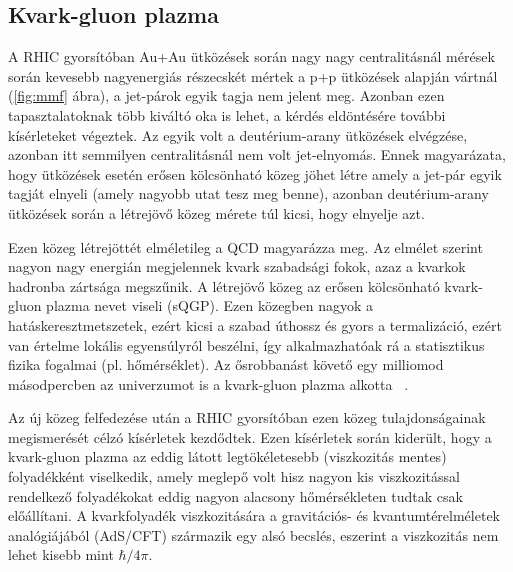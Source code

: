 \documentclass[11pt,a4paper]{article}
\numberwithin{equation}{subsection}
\numberwithin{figure}{section}
\begin{document}
\subsection{Kvark-gluon plazma}

A RHIC gyorsítóban Au+Au ütközések során nagy nagy centralitásnál mérések során kevesebb nagyenergiás részecskét mértek a p+p ütközések alapján vártnál (\ref{fig:mmf} ábra), a jet-párok egyik tagja nem jelent meg. Azonban ezen tapasztalatoknak több kiváltó oka is lehet, a kérdés eldöntésére további kísérleteket végeztek. Az egyik volt a deutérium-arany ütközések elvégzése, azonban itt semmilyen centralitásnál nem volt jet-elnyomás. Ennek magyarázata, hogy ütközések esetén erősen kölcsönható közeg jöhet létre amely a jet-pár egyik tagját elnyeli (amely nagyobb utat tesz meg benne), azonban deutérium-arany ütközések során a létrejövő közeg mérete túl kicsi, hogy elnyelje azt.

Ezen közeg létrejöttét elméletileg a QCD magyarázza meg. Az elmélet szerint nagyon nagy energián megjelennek kvark szabadsági fokok, azaz a kvarkok hadronba zártsága megszűnik. A létrejövő közeg az erősen kölcsönható kvark-gluon plazma nevet viseli (sQGP). Ezen közegben nagyok a hatáskeresztmetszetek, ezért kicsi a szabad úthossz és gyors a termalizáció, ezért van értelme lokális egyensúlyról beszélni, így alkalmazhatóak rá a statisztikus fizika fogalmai (pl. hőmérséklet). Az ősrobbanást követő egy milliomod másodpercben az univerzumot is a kvark-gluon plazma alkotta ~\cite{SWeinberg}.

Az új közeg felfedezése után a RHIC gyorsítóban ezen közeg tulajdonságainak megismerését célzó kísérletek kezdődtek. Ezen kísérletek során kiderült, hogy a kvark-gluon plazma az eddig látott legtökéletesebb (viszkozitás mentes) folyadékként viselkedik, amely meglepő volt hisz nagyon kis viszkozitással rendelkező folyadékokat eddig nagyon alacsony hőmérsékleten tudtak csak előállítani. A kvarkfolyadék viszkozitására a gravitációs- és kvantumtérelméletek analógiájából (AdS/CFT) származik egy alsó becslés, eszerint a viszkozitás nem lehet kisebb mint $\hbar/4\pi$.
\end{document}
